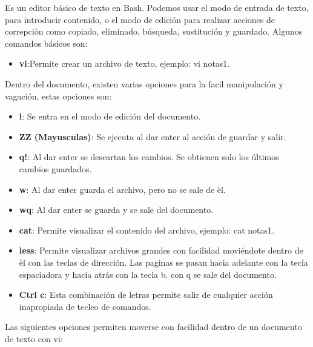 \documentclass[a4paper,12pt]{article}
\begin{document}
Es un editor básico de texto en Bash. Podemos usar el modo de entrada de texto, para introducir contenido, o el modo de edición para realizar acciones de correpciòn como copiado, eliminado, búsqueda, sustitución y guardado. Algunos comandos básicos son:

\begin{itemize}
\item{\textbf{vi}}:Permite crear un archivo de texto, ejemplo: vi notas1.
\end{itemize}

Dentro del documento, existen varias opciones para la facil manipulación y vagación, estas opciones son:

\begin{itemize}
\item{\textbf{i}}: Se entra en el modo de edición del documento.
\item{\textbf{ZZ (Mayusculas)}}: Se ejecuta al dar enter al acción de guardar y salir.
\item{\textbf{q!}}: Al dar enter se descartan los cambios. Se obtienen solo los últimos cambios guardados.
\item{\textbf{w}}: Al dar enter guarda el archivo, pero no se sale de èl.
\item{\textbf{wq}}: Al dar enter se guarda y se sale del documento. 
\item{\textbf{cat}}: Permite visualizar el contenido del archivo, ejemplo: cat notas1.
\item{\textbf{less}}: Permite visualizar archivos grandes con facilidad moviéndote dentro de èl con las teclas de dirección. Las paginas se pasan hacia adelante con la tecla espaciadora y hacia atrás con la tecla b. con q se sale del documento.
\item{\textbf{Ctrl c}}: Esta combinación de letras permite salir de cualquier acción inapropiada de tecleo de comandos.
\end{itemize}

Las siguientes opciones permiten moverse con facilidad dentro de un documento de texto con vi:
\end{document}
